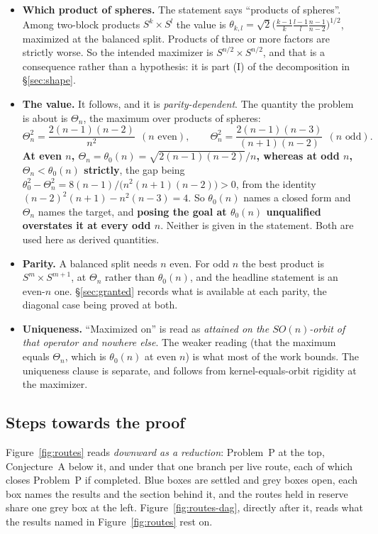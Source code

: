 \begin{itemize}[leftmargin=1.4em]
\item \textbf{Which product of spheres.} The statement says ``products of spheres''. Among two-block products $S^k\times S^l$ the value is $\theta_{k,l}=\sqrt2\big(\tfrac{k-1}{k}\tfrac{l-1}{l}\tfrac{n-1}{n-2}\big)^{1/2}$, maximized at the balanced split. Products of three or more factors are strictly worse. So the intended maximizer is $S^{n/2}\times S^{n/2}$, and that is a consequence rather than a hypothesis: it is part (I) of the decomposition in \S\ref{sec:shape}.
\item \textbf{The value.} It follows, and it is \emph{parity-dependent}. The quantity the problem is about is $\Theta_n$, the maximum over products of spheres:
\[
\Theta_n^2=\frac{2(n-1)(n-2)}{n^2}\ \ (n\text{ even}),\qquad
\Theta_n^2=\frac{2(n-1)(n-3)}{(n+1)(n-2)}\ \ (n\text{ odd}).
\]
\textbf{At even $n$, $\Theta_n=\theta_0(n)=\sqrt{2(n-1)(n-2)}/n$, whereas at odd $n$, $\Theta_n<\theta_0(n)$ strictly}, the gap being $\theta_0^2-\Theta_n^2=8(n-1)/\big(n^2(n+1)(n-2)\big)>0$, from the identity $(n-2)^2(n+1)-n^2(n-3)=4$. So $\theta_0(n)$ names a closed form and $\Theta_n$ names the target, and \textbf{posing the goal at $\theta_0(n)$ unqualified overstates it at every odd $n$}. Neither is given in the statement. Both are used here as derived quantities.
\item \textbf{Parity.} A balanced split needs $n$ even. For odd $n$ the best product is $S^{m}\times S^{m+1}$, at $\Theta_n$ rather than $\theta_0(n)$, and the headline statement is an even-$n$ one. \S\ref{sec:granted} records what is available at each parity, the diagonal case being proved at both.
\item \textbf{Uniqueness.} ``Maximized on'' is read as \emph{attained on the $SO(n)$-orbit of that operator and nowhere else}. The weaker reading (that the maximum equals $\Theta_n$, which is $\theta_0(n)$ at even $n$) is what most of the work bounds. The uniqueness clause is separate, and follows from kernel-equals-orbit rigidity at the maximizer.
\end{itemize}

\subsection{Steps towards the proof}\label{sec:diagram}

Figure~\ref{fig:routes} reads \emph{downward as a reduction}: Problem~P at the top, Conjecture~A below it, and under that one branch per live route, each of which closes Problem~P if completed. Blue boxes are settled and grey boxes open, each box names the results and the section behind it, and the routes held in reserve share one grey box at the left. Figure~\ref{fig:routes-dag}, directly after it, reads what the results named in Figure~\ref{fig:routes} rest on.

